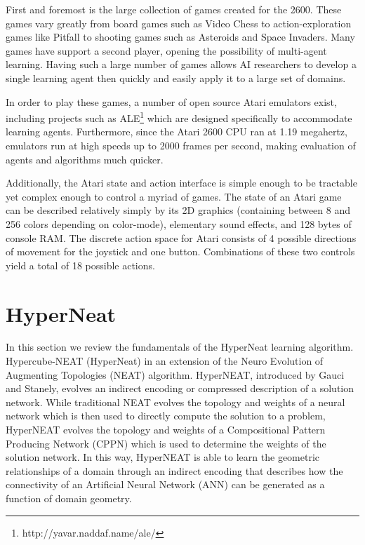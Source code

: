 \documentclass{acm_proc_article-sp}
\begin{document}
First and foremost is the large collection of games created for the 2600. These games vary greatly from board games such as Video Chess to action-exploration games like Pitfall to shooting games such as Asteroids and Space Invaders. Many games have support a second player, opening the possibility of multi-agent learning. Having such a large number of games allows AI researchers to develop a single learning agent then quickly and easily apply it to a large set of domains.

In order to play these games, a number of open source Atari emulators exist, including projects such as ALE\footnote{http://yavar.naddaf.name/ale/} which are designed specifically to accommodate learning agents. Furthermore, since the Atari 2600 CPU ran at 1.19 megahertz, emulators run at high speeds up to 2000 frames per second, making evaluation of agents and algorithms much quicker.

Additionally, the Atari state and action interface is simple enough to be tractable yet complex enough to control a myriad of games. The state of an Atari game can be described relatively simply by its 2D graphics (containing between 8 and 256 colors depending on color-mode), elementary sound effects, and 128 bytes of console RAM. The discrete action space for Atari consists of 4 possible directions of movement for the joystick and one button. Combinations of these two controls yield a total of 18 possible actions.

\section{HyperNeat}
\label{sec:hyperneat}
In this section we review the fundamentals of the HyperNeat learning algorithm. Hypercube-NEAT (HyperNeat) in an extension of the Neuro Evolution of Augmenting Topologies (NEAT) algorithm\cite{stanley02}. HyperNEAT, introduced by Gauci and Stanely\cite{gauci08}, evolves an indirect encoding or compressed description of a solution network. While traditional NEAT evolves the topology and weights of a neural network which is then used to directly compute the solution to a problem, HyperNEAT evolves the topology and weights of a Compositional Pattern Producing Network (CPPN) which is used to determine the weights of the solution network. In this way, HyperNEAT is able to learn the geometric relationships of a domain through an indirect encoding that describes how the connectivity of an Artificial Neural Network (ANN) can be generated as a function of domain geometry. 
\end{document}
